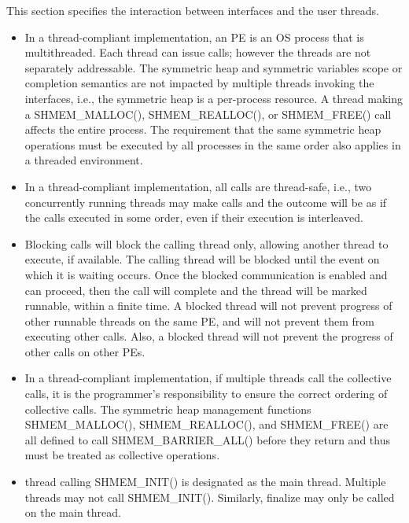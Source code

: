 This section specifies the interaction between \openshmem{} interfaces and the
user threads. 

\begin{itemize}

\item
In a thread-compliant implementation, an \openshmem{} PE is an OS process that
is multithreaded. Each thread can issue \openshmem{} calls; however the threads
are not separately addressable. The symmetric heap and symmetric variables scope
or completion semantics are not impacted by multiple threads invoking the
\openshmem{} interfaces, i.e., the symmetric heap is a per-process resource. A
thread making a SHMEM\_MALLOC(), SHMEM\_REALLOC(), or SHMEM\_FREE() call affects
the entire process. The requirement that the same symmetric heap operations must
be executed by all processes in the same order also applies in a threaded
environment.
                                    	
\item In a thread-compliant implementation, 
all \openshmem{} calls are thread-safe, i.e., two concurrently running threads
may make \openshmem{} calls and the outcome will be as if the calls executed in
some order, even if their execution is interleaved.

\item Blocking \openshmem{} calls will block the calling thread only, allowing another
thread to execute, if available. The calling thread will be blocked until the
event on which it is waiting occurs. Once the blocked communication is enabled
and can proceed, then the call will complete and the thread will be marked
runnable, within a finite time. A blocked thread will not prevent progress of
other runnable threads on the same \ac{PE}, and will not prevent them from
executing other \openshmem{} calls. Also, a blocked thread will not prevent the
progress of other \openshmem{} calls on other \acp{PE}. 
 
\item
In a thread-compliant implementation, if multiple threads call the collective
calls, it is the programmer's responsibility to ensure the correct ordering of
collective calls.  The symmetric heap management functions SHMEM\_MALLOC(),
SHMEM\_REALLOC(), and SHMEM\_FREE() are all defined to call
SHMEM\_BARRIER\_ALL() before they return and thus must be treated as collective
operations.

\item
\openshmem{} thread calling SHMEM\_INIT() is designated as the main thread.
Multiple threads may not call SHMEM\_INIT(). Similarly, \openshmem{} finalize
may only be called on the main thread.

\end{itemize} 
 

